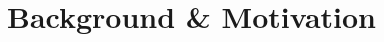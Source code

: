 \documentclass[conference]{IEEEtran}
\begin{document}

\section{Background \& Motivation}
\end{document}
